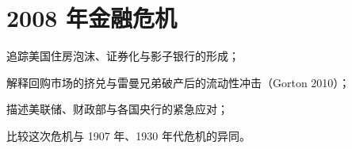 \chapter{2008 年金融危机}\label{ch:gfc}

\begin{chapterguide}
\begin{guidegoals}
\item 追踪美国住房泡沫、证券化与影子银行的形成；
\item 解释回购市场的挤兑与雷曼兄弟破产后的流动性冲击（Gorton 2010）；
\item 描述美联储、财政部与各国央行的紧急应对；
\item 比较这次危机与 1907 年、1930 年代危机的异同。
\end{guidegoals}
\end{chapterguide}

\chapterstub

